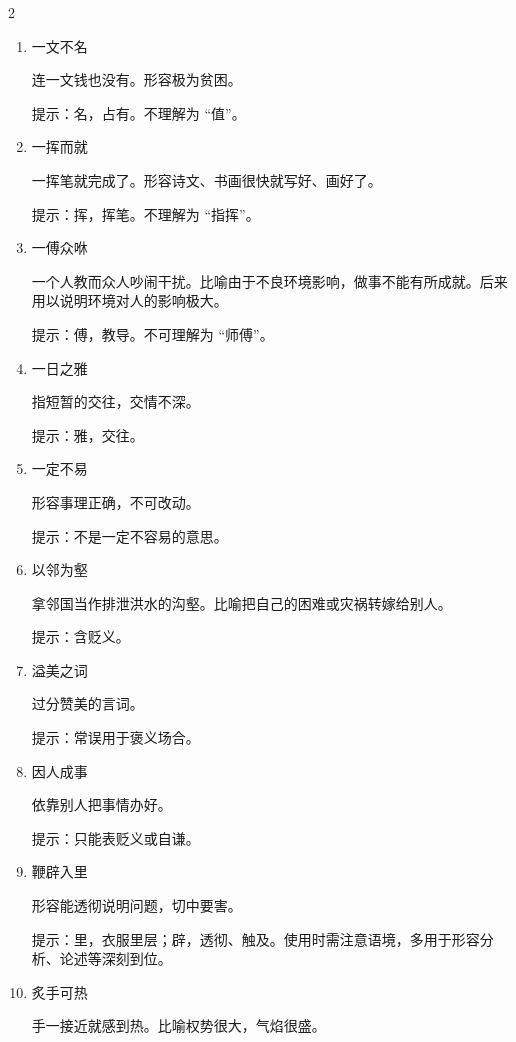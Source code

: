 \documentclass[final,oneside]{ctexbook}
\begin{document}
\begin{multicols}{2}
\begin{enumerate}
      提示：要，简要。不理解为 “重要”。

    \item 一文不名

      连一文钱也没有。形容极为贫困。

      提示：名，占有。不理解为 “值”。

    \item 一挥而就

      一挥笔就完成了。形容诗文、书画很快就写好、画好了。

      提示：挥，挥笔。不理解为 “指挥”。

    \item 一傅众咻

      一个人教而众人吵闹干扰。比喻由于不良环境影响，做事不能有所成就。后来用以说明环境对人的影响极大。

      提示：傅，教导。不可理解为 “师傅”。

    \item 一日之雅

      指短暂的交往，交情不深。

      提示：雅，交往。

    \item 一定不易

      形容事理正确，不可改动。

      提示：不是一定不容易的意思。

    \item 以邻为壑

      拿邻国当作排泄洪水的沟壑。比喻把自己的困难或灾祸转嫁给别人。

      提示：含贬义。

    \item 溢美之词

      过分赞美的言词。

      提示：常误用于褒义场合。

    \item 因人成事

      依靠别人把事情办好。

      提示：只能表贬义或自谦。

    \item 鞭辟入里

      形容能透彻说明问题，切中要害。

      提示：里，衣服里层；辟，透彻、触及。使用时需注意语境，多用于形容分析、论述等深刻到位。

    \item 炙手可热

      手一接近就感到热。比喻权势很大，气焰很盛。


\end{enumerate}
\end{multicols}
\end{document}
